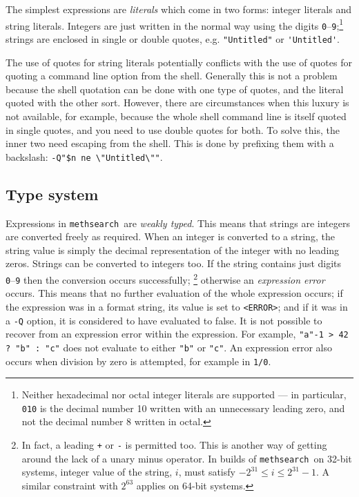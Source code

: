 \documentclass[a4paper,11pt,oneside]{book}
\def\textitidx#1{\textit{#1}\index{#1}}
\def\methsearch{\texttt{meth\-search}}
\begin{document}
The simplest expressions are \textitidx{literals} which come in two forms:
integer literals and string literals.  Integers are just written in the normal way using the digits
\verb+0+--\verb+9+;\footnote{Neither hexadecimal nor octal integer literals
are supported --- in particular, \verb+010+ is the decimal number 10 written
with an unnecessary leading zero, and not the decimal number 8 written in 
octal.}  strings are enclosed in single or double quotes, e.g. 
\verb+"Untitled"+ or \verb+'Untitled'+.

The use of quotes for string literals potentially conflicts with
the use of quotes for quoting a command line option from the 
shell.  Generally this is not a 
problem because the shell quotation can be done with one type of quotes,
and the literal quoted with the other sort.  
However, there are circumstances when this luxury is not available, 
for example, because the whole shell command
line is itself quoted in single quotes, and you need to use double quotes for 
both.  To solve this, the inner two
need escaping  
from the shell.  This is done by prefixing them with 
a backslash: 
\verb+-Q"$n ne \"Untitled\""+.

\subsection{Type system}\label{type_sys}

Expressions in \methsearch\ are \textit{weakly typed}. 
This means that strings are integers are converted freely as required.
When an integer is converted to a string, the string value is simply the
decimal representation of the integer with no leading zeros.  
Strings can be converted to integers too.  If the string contains just
digits \verb+0+--\verb+9+ then the conversion occurs successfully;%
\footnote{In fact, a leading \verb-+- or \verb+-+ is permitted too.  
This is another way of getting around the lack of a unary minus operator.%
  In builds of \methsearch\ on 32-bit
systems, integer value of the string, $i$, must satisfy 
$-2^{31} \le i \le 2^{31}-1$.  
A similar constraint with $2^{63}$ applies on 64-bit systems.}
otherwise an \textitidx{expression error} occurs.  
This means that no further evaluation
of the whole expression occurs; if the expression was in a format string,
its value is set to \verb+<ERROR>+; and if it was in a \verb+-Q+ option,
it is considered to have evaluated to false.  It is not possible to recover
from an expression error within the expression.  For example, 
\verb+"a"-1 > 42 ? "b" : "c"+ does not evaluate to either 
\verb+"b"+ or \verb+"c"+.
An expression error also occurs when division by zero is attempted,%
 for example in \verb+1/0+.
\end{document}
